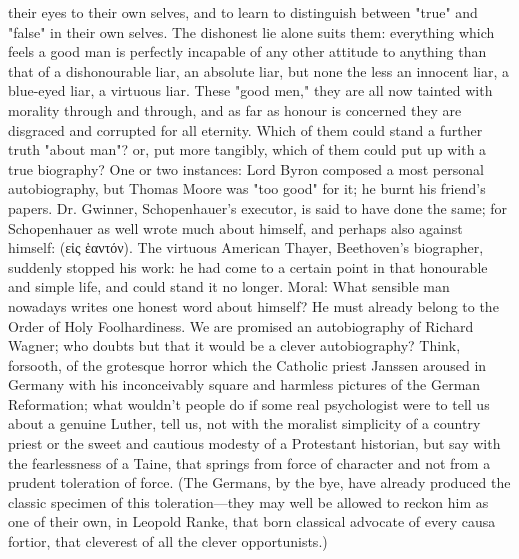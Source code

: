 \documentclass[12pt]{article}
\begin{document}
their eyes to their own selves, and to learn to distinguish between "true" and "false" in their own selves. The dishonest lie alone suits them: everything which feels a good man is perfectly incapable of any other attitude to anything than that of a dishonourable liar, an absolute liar, but none the less an innocent liar, a blue-eyed liar, a virtuous liar. These "good men," they are all now tainted with morality through and through, and as far as honour is concerned they are disgraced and corrupted for all eternity. Which of them could stand a further truth "about man"? or, put more tangibly, which of them could put up with a true biography? One or two instances: Lord Byron composed a most personal autobiography, but Thomas Moore was "too good" for it; he burnt his friend's papers. Dr. Gwinner, Schopenhauer's executor, is said to have done the same; for Schopenhauer as well wrote much about himself, and perhaps also against himself: (εἰς ἑαντόν). The virtuous American Thayer, Beethoven's biographer, suddenly stopped his work: he had come to a certain point in that honourable and simple life, and could stand it no longer. Moral: What sensible man nowadays writes one honest word about himself? He must already belong to the Order of Holy Foolhardiness. We are promised an autobiography of Richard Wagner; who doubts but that it would be a clever autobiography? Think, forsooth, of the grotesque horror which the Catholic priest Janssen aroused in Germany with his inconceivably square and harmless pictures of the German Reformation; what wouldn't people do if some real psychologist were to tell us about a genuine Luther, tell us, not with the moralist simplicity of a country priest or the sweet and cautious modesty of a Protestant historian, but say with the fearlessness of a Taine, that springs from force of character and not from a prudent toleration of force. (The Germans, by the bye, have already produced the classic specimen of this toleration---they may well be allowed to reckon him as one of their own, in Leopold Ranke, that born classical advocate of every causa fortior, that cleverest of all the clever opportunists.)
\end{document}
